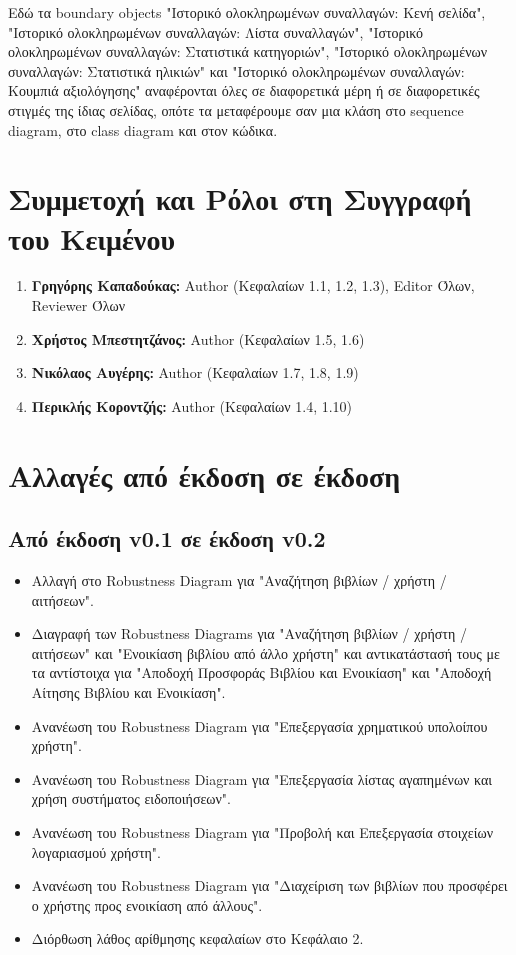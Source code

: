 \documentclass[12pt,a4paper]{article}
\begin{document}
Εδώ τα boundary objects "Ιστορικό ολοκληρωμένων συναλλαγών: Κενή σελίδα", "Ιστορικό ολοκληρωμένων συναλλαγών: Λίστα συναλλαγών", "Ιστορικό ολοκληρωμένων συναλλαγών: Στατιστικά κατηγοριών", "Ιστορικό ολοκληρωμένων συναλλαγών: Στατιστικά ηλικιών" και "Ιστορικό ολοκληρωμένων συναλλαγών: Κουμπιά αξιολόγησης" αναφέρονται όλες σε διαφορετικά μέρη ή σε διαφορετικές στιγμές της ίδιας σελίδας, οπότε τα μεταφέρουμε σαν μια κλάση στο sequence diagram, στο class diagram και στον κώδικα.

\section{Συμμετοχή και Ρόλοι στη Συγγραφή του Κειμένου}
\begin{enumerate}
	\item \textbf{Γρηγόρης Καπαδούκας:} Author (Κεφαλαίων 1.1, 1.2, 1.3), Editor Όλων, Reviewer Όλων
	\item \textbf{Χρήστος Μπεστητζάνος:} Author (Κεφαλαίων 1.5, 1.6)
   	\item \textbf{Νικόλαος Αυγέρης:} Author (Κεφαλαίων 1.7, 1.8, 1.9)
	\item \textbf{Περικλής Κοροντζής:} Author (Κεφαλαίων 1.4, 1.10)
\end{enumerate}

\section{Αλλαγές από έκδοση σε έκδοση}

\subsection{Από έκδοση v0.1 σε έκδοση v0.2}
\begin{itemize}
    \item Αλλαγή στο Robustness Diagram για "Αναζήτηση βιβλίων / χρήστη / αιτήσεων".
    \item Διαγραφή των Robustness Diagrams για "Αναζήτηση βιβλίων / χρήστη / αιτήσεων" και "Ενοικίαση βιβλίου από άλλο χρήστη" και αντικατάστασή τους με τα αντίστοιχα για "Αποδοχή Προσφοράς Βιβλίου και Ενοικίαση" και "Αποδοχή Αίτησης Βιβλίου και Ενοικίαση".
    \item Ανανέωση του Robustness Diagram για "Επεξεργασία χρηματικού υπολοίπου χρήστη".
    \item Ανανέωση του Robustness Diagram για "Επεξεργασία λίστας αγαπημένων και χρήση συστήματος ειδοποιήσεων".
    \item Ανανέωση του Robustness Diagram για "Προβολή και Επεξεργασία στοιχείων λογαριασμού χρήστη".
    \item Ανανέωση του Robustness Diagram για "Διαχείριση των βιβλίων που προσφέρει ο χρήστης
προς ενοικίαση από άλλους".
    \item Διόρθωση λάθος αρίθμησης κεφαλαίων στο Κεφάλαιο 2.
\end{itemize}
\end{document}
